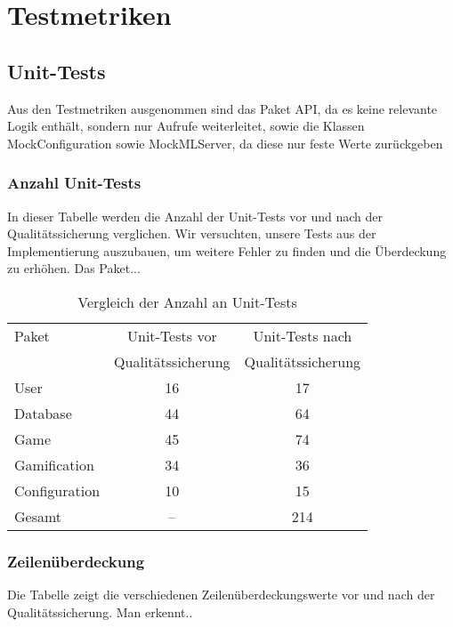 \documentclass[a4paper]{scrreprt}
\begin{document}
    \chapter{Testmetriken}
    \section{Unit-Tests}
    Aus den Testmetriken ausgenommen sind das Paket API, da es keine relevante Logik enthält, sondern nur Aufrufe weiterleitet,
    sowie die Klassen MockConfiguration sowie MockMLServer, da diese nur feste Werte zurückgeben

    \subsection{Anzahl Unit-Tests}
    In dieser Tabelle werden die Anzahl der Unit-Tests vor und nach der Qualitätssicherung verglichen. Wir versuchten, unsere Tests aus der Implementierung
    auszubauen, um weitere Fehler zu finden und die Überdeckung zu erhöhen. Das Paket...

    \vspace{20pt}
    \begin{table}[h]
        \begin{center}
        \begin{tabular}{ | l | c | c | }
            \hline
            Paket & Unit-Tests vor & Unit-Tests nach  \\
            & Qualitätssicherung & Qualitätssicherung \\ \hline
            User & 16 & 17 \\
            Database & 44 & 64 \\
            Game & 45 & 74 \\
            Gamification & 34 & 36 \\
            Configuration & 10 & 15 \\
            Gesamt & -- & 214  \\
            \hline
        \end{tabular}
        \end{center}
        \caption{Vergleich der Anzahl an Unit-Tests}
    \end{table}%

    \subsection{Zeilenüberdeckung}
    Die Tabelle zeigt die verschiedenen Zeilenüberdeckungswerte vor und nach der Qualitätssicherung. Man erkennt..
\end{document}
